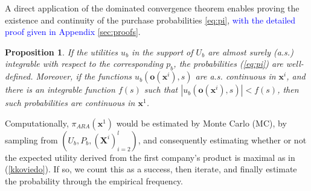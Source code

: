 \documentclass[a4paper,fleqn, 11pt]{cas-sc}
\newtheorem{proposition}{Proposition}
\begin{document}
A direct application
of the dominated convergence theorem \citep{royden2010real} enables proving the existence and continuity 
of the purchase probabilities \eqref{eq:pi}, \textcolor{blue}{with the detailed proof given in Appendix \ref{sec:proofs}}.
\begin{proposition}
If the utilities $u_b$ in the support of 
$U_b$ are almost surely (a.s.) integrable with respect to the corresponding $p_b$, the probabilities
(\ref{eq:pi}) are well-defined. Moreover, if the functions  
$u_b({\bm o} ({\bm x}^i ), s)$ are a.s. continuous in ${\bm x}^i$,
and there is an integrable function $f(s)$
such that 
$|u_b({\bm o} ({\bm x}^i ), s)| < f(s)$, then    such 
probabilities are continuous in ${\bm x}^1$.
\end{proposition}



\noindent   Computationally, $\pi_{ARA}({\bm x}^1)$ would be estimated by Monte Carlo (MC), by sampling 
from $(U_b, P_b, ({\bm X}^i)_{i=2}^l)$, and consequently estimating whether
or not the expected utility derived from the first company's product is maximal as in (\ref{kkoviedo}).
 If so, we count this as a success, then iterate, and finally estimate the probability through the empirical frequency.
\end{document}
